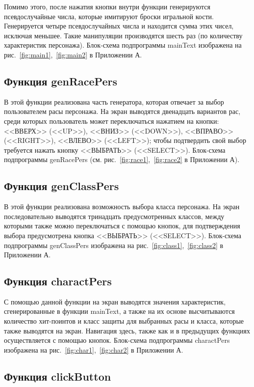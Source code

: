 \documentclass{altsu-report}
\begin{document}
Помимо этого, после нажатия кнопки внутри функции генерируются псевдослучайные числа, которые имитируют броски игральной кости. Генерируется четыре псевдослучайных числа и находится сумма этих чисел, исключая меньшее. Такие манипуляции производятся шесть раз (по количеству характеристик персонажа). Блок-схема подпрограммы mainText изображена на рис.~\ref{fig:main1},~\ref{fig:main2} в Приложении А.

\subsection{Функция genRacePers}

В этой функции реализована часть генератора, которая отвечает за выбор пользователем расы персонажа. На экран выводятся двенадцать вариантов рас, среди которых пользователь может переключаться нажатием на кнопки: <<ВВЕРХ>> (<<UP>>), <<ВНИЗ>> (<<DOWN>>), <<ВПРАВО>> (<<RIGHT>>), <<ВЛЕВО>> (<<LEFT>>); чтобы подтвердить свой выбор требуется нажать кнопку <<ВЫБРАТЬ>> (<<SELECT>>). Блок-схема подпрограммы genRacePers (см. рис.~\ref{fig:race1},~\ref{fig:race2} в Приложении А).

\subsection{Функция genClassPers}

В этой функции реализована возможность выбора класса персонажа. На экран последовательно выводятся тринадцать предусмотренных классов, между которыми также можно переключаться с помощью кнопок, для подтверждения выбора предусмотрена кнопка <<ВЫБРАТЬ>> (<<SELECT>>). Блок-схема подпрограммы genClassPers изображена на рис.~\ref{fig:class1},~\ref{fig:class2} в Приложении А.

\subsection{Функция charactPers}

С помощью данной функции на экран выводятся значения характеристик, сгенерированные в функции mainText, а также на их основе высчитываются количество хит-поинтов и класс защиты для выбранных расы и класса, которые также выводятся на экран. Навигация здесь, также как и в предыдущих функциях осуществляется с помощью кнопок. Блок-схема подпрограммы charactPers изображена на рис.~\ref{fig:char1},~\ref{fig:char2} в Приложении А.

\subsection{Функция clickButton}
\end{document}
